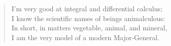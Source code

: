 \documentclass{article}
\newenvironment{linkwords}[2][]{}{}
\begin{document}
\newcommand{\stopwords}{a an the of in am and or but i we me you us them}

\begin{linkwords}[\stopwords]{http://www.google.com/search?q=define:\%s}
\begin{verse}
  I'm very good at integral and differential calculus; \\
  I know the scientific names of beings animalculous:  \\
  In short, in matters vegetable, animal, and mineral, \\
  I am the very model of a modern Major-General.
\end{verse}
\end{linkwords}
\end{document}
